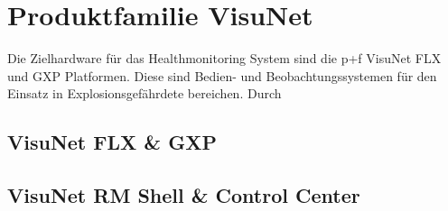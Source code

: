 \section{Produktfamilie VisuNet}
Die Zielhardware für das Healthmonitoring System sind die \ac{p+f} VisuNet FLX und GXP Platformen. Diese sind Bedien- und Beobachtungssystemen für den Einsatz in Explosionsgefährdete bereichen. Durch  

\subsection{VisuNet FLX \& GXP}

\subsection{VisuNet RM Shell \& Control Center}
